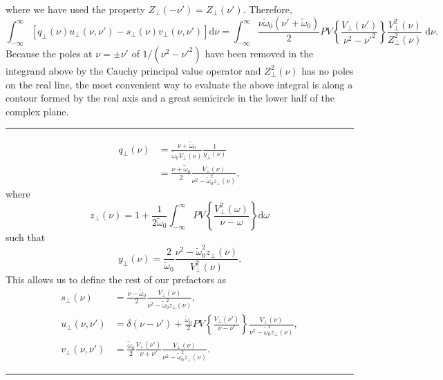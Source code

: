 \documentclass{article}
\begin{document}
where we have used the property $Z_\perp(-\nu') = Z_\perp(\nu')$. Therefore,
\begin{equation}
\int_{-\infty}^\infty\left[q_\perp(\nu)u_\perp(\nu,\nu') - s_\perp(\nu)v_\perp(\nu,\nu')\right]\mathrm{d}\nu = \int_{-\infty}^\infty\frac{\nu\tilde{\omega}_0(\nu' + \tilde{\omega}_0)}{2}PV\left\{\frac{V_\perp(\nu')}{\nu^2 - \nu'^2}\right\}\frac{V_\perp^2(\nu)}{Z_\perp^2(\nu)}\;\mathrm{d}\nu.
\end{equation}
Because the poles at $\nu = \pm\nu'$ of $1/(\nu^2 - \nu'^2)$ have been removed in the integrand above by the Cauchy principal value operator and $Z_\perp^2(\nu)$ has no poles on the real line, the most convenient way to evaluate the above integral is along a contour formed by the real axis and a great semicircle in the lower half of the complex plane.










\noindent\rule{\textwidth}{0.5pt}
\begin{equation}
\begin{split}
q_\perp(\nu) &= \frac{\nu + \tilde{\omega}_0}{\tilde{\omega}_0V_\perp(\nu)}\frac{1}{y_\perp(\nu)}\\
&= \frac{\nu + \tilde{\omega}_0}{2}\frac{V_\perp(\nu)}{\nu^2 - \tilde{\omega}_0^2z_\perp(\nu)},
\end{split}
\end{equation}
where
\begin{equation}
z_\perp(\nu) = 1 + \frac{1}{2\tilde{\omega}_0}\int_{-\infty}^\infty PV\left\{\frac{V_\perp^2(\omega)}{\nu - \omega}\right\}\mathrm{d}\omega
\end{equation}
such that
\begin{equation}
y_\perp(\nu) = \frac{2}{\tilde{\omega}_0}\frac{\nu^2 - \tilde{\omega}_0^2z_\perp(\nu)}{V_\perp^2(\nu)}.
\end{equation}
This allows us to define the rest of our prefactors as
\begin{equation}
\begin{split}
s_\perp(\nu) &= \frac{\nu - \tilde{\omega}_0}{2}\frac{V_\perp(\nu)}{\nu^2 - \tilde{\omega}_0^2z_\perp(\nu)},\\
u_\perp(\nu,\nu') &= \delta(\nu - \nu') + \frac{\tilde{\omega}_0}{2}PV\left\{\frac{V_\perp(\nu')}{\nu - \nu'}\right\}\frac{V_\perp(\nu)}{\nu^2 - \tilde{\omega}_0^2z_\perp(\nu)},\\
v_\perp(\nu,\nu') &= \frac{\tilde{\omega}_0}{2}\frac{V_\perp(\nu')}{\nu + \nu'}\frac{V_\perp(\nu)}{\nu^2 - \tilde{\omega}_0^2z_\perp(\nu)}.
\end{split}
\end{equation}
\noindent\rule{\textwidth}{0.5pt}
\end{document}
